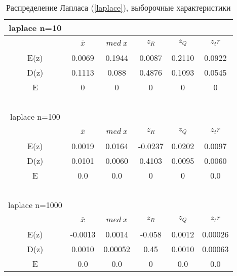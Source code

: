 \documentclass[12pt,a4paper]{article}
\begin{document}
			\begin{table}[h!]
				\label{tabular:laplace}
				\begin{center}
					\begin{tabular}{|c|c|c|c|c|c|} 
						
						\hline
						laplace n=10 & \ & \ & \ & \ & \ \\ \hline
						\ & $\overline{x}$ & $med \ x$ & $z_R$ & $z_Q$ & $z_tr$ \\ \hline
						E(z) & 0.0069 & 0.1944 & 0.0087 & 0.2110 & 0.0922 \\ \hline
						D(z) & 0.1113  & 0.088 & 0.4876 &  0.1093  &  0.0545 \\ \hline
						E & 0 & 0 & 0 & 0 & 0\\\hline
						\ & \ & \ & \ & \ & \ \\ \hline
						
						laplace n=100 & \ & \ & \ & \ & \ \\ \hline
						\ & $\overline{x}$ & $med \ x$  & $z_R$  & $z_Q$  & $z_tr$ \\ \hline
						E(z) & 0.0019 & 0.0164 &  -0.0237 & 0.0202 & 0.0097 \\ \hline
						D(z) & 0.0101   & 0.0060 & 0.4103 &  0.0095 & 0.0060 \\ \hline
						E & 0.0 & 0.0 & 0 & 0 & 0.0\\\hline
						\ & \ & \ & \ & \ & \ \\ \hline
						
						laplace n=1000 & \ & \ & \ & \ & \ \\ \hline
						\ & $\overline{x}$ & $med \ x$  & $z_R$  & $z_Q$  & $z_tr$ \\ \hline
						E(z) & -0.0013 & 0.0014 &  -0.058 & 0.0012 & 0.00026 \\ \hline
						D(z) & 0.0010   & 0.00052 & 0.45 &  0.0010   &  0.00063 \\ \hline
						E & 0.0 & 0.0 & 0 & 0.0 & 0.0\\\hline
						
					\end{tabular}
				\end{center}
				\caption{Распределение Лапласа (\ref{laplace}), выборочные характеристики}
			\end{table}
		
\end{document}
